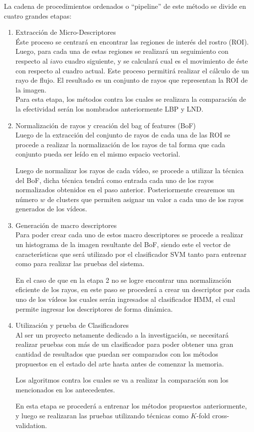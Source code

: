 \documentclass{article}
\begin{document}
La cadena de procedimientos ordenados o “pipeline” de este método se divide en cuatro grandes etapas:
    \begin{enumerate}
    \item Extracción de Micro-Descriptores\\
    Éste proceso se centrará en encontrar las regiones de interés del rostro (ROI). Luego, para cada una de estas regiones se realizará un seguimiento con respecto al $i$avo cuadro siguiente, y se calculará cual es el movimiento de éste con respecto al cuadro actual. Este proceso permitirá realizar el cálculo de un rayo de flujo. El resultado es un conjunto de rayos que representan la ROI de la imagen.\\
    Para esta etapa, los métodos contra los cuales se realizara la comparación de la efectividad serán los nombrados anteriormente LBP y LND.
    \item Normalización de rayos y creación del bag of features (BoF)\\
Luego de la extracción del conjunto de rayos de cada una de las ROI se procede a realizar la normalización de los rayos de tal forma que cada conjunto pueda ser leído en el mismo espacio vectorial.

Luego de normalizar los rayos de cada vídeo, se procede a utilizar la técnica del BoF, dicha técnica tendrá como entrada cada uno de los rayos normalizados obtenidos en el paso anterior. Posteriormente crearemos un número $w$ de clusters que permiten asignar un valor a cada uno de los rayos generados de los vídeos. 

    \item Generación de macro descriptores\\
Para poder crear cada uno de estos macro descriptores se procede a realizar un histograma de la imagen resultante del BoF, siendo este el vector de características que será utilizado por el clasificador SVM tanto para entrenar como para realizar las pruebas del sistema.

En el caso de que en la etapa 2 no se logre encontrar una normalización eficiente de los rayos, en este paso se procederá a crear un descriptor por cada uno de los vídeos los cuales serán ingresados al clasificador HMM, el cual permite ingresar los descriptores de forma dinámica.
	
    \item Utilización y prueba de Clasificadores\\
Al ser un proyecto netamente dedicado a la investigación, se necesitará realizar pruebas con más de un clasificador para poder obtener una gran cantidad de resultados que puedan ser comparados con los métodos propuestos en el estado del arte hasta antes de comenzar la memoria. 

Los algoritmos contra los cuales se va a realizar la comparación son los mencionados en los antecedentes.

En esta etapa se procederá a entrenar los métodos propuestos anteriormente, y luego se realizaran las pruebas utilizando técnicas como $K$-fold cross-validation.
    \end{enumerate}
    
\end{document}
